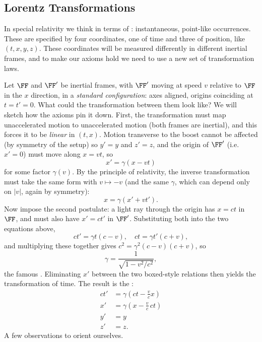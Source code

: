 \subsection{Lorentz Transformations}

In special relativity we think in terms of : instantaneous, point-like occurrences. These are specified by four coordinates, one of time and three of position, like $(t, x, y, z)$.
These coordinates will be measured differently in different inertial frames, and to make our axioms hold we need to use a new set of transformation laws.

Let $\FF$ and $\FF'$ be inertial frames, with $\FF'$ moving at speed $v$ relative to $\FF$ in the $x$ direction, in a \emph{standard configuration}: axes aligned, origins coinciding at $t = t' = 0$. What could the transformation between them look like? We will sketch how the axioms pin it down. First, the transformation must map unaccelerated motion to unaccelerated motion (both frames are inertial), and this forces it to be \emph{linear} in $(t, x)$. Motion transverse to the boost cannot be affected (by symmetry of the setup) so $y' = y$ and $z' = z$, and the origin of $\FF'$ (i.e.\ $x' = 0$) must move along $x = vt$, so
$$
x' = \gamma (x - vt)
$$
for some factor $\gamma(v)$. By the principle of relativity, the inverse transformation must take the same form with $v \mapsto -v$ (and the same $\gamma$, which can depend only on $|v|$, again by symmetry):
$$
x = \gamma(x' + vt').
$$
Now impose the second postulate: a light ray through the origin has $x = ct$ in $\FF$, and must also have $x' = ct'$ in $\FF'$. Substituting both into the two equations above,
$$
ct' = \gamma t (c - v), \quad ct = \gamma t'(c + v),
$$
and multiplying these together gives $c^2 = \gamma^2 (c - v)(c + v)$, so
$$
\gamma = \frac{1}{\sqrt{1 - v^2/c^2}},
$$
the famous . Eliminating $x'$ between the two boxed-style relations then yields the transformation of time. The result is the :
\begin{align*}
	ct' &= \gamma\left(ct - \frac{v}{c}x\right) \\
	x' &= \gamma \left(x - \frac{v}{c}\, ct\right) \\
	y' &= y \\
	z' &= z.
\end{align*}
A few observations to orient ourselves.

